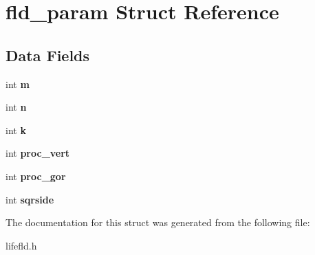 \hypertarget{structfld__param}{}\section{fld\+\_\+param Struct Reference}
\label{structfld__param}
\subsection*{Data Fields}
\begin{DoxyCompactItemize}
\item 
\hypertarget{structfld__param_a742204794ea328ba293fe59cec79b990}{}int {\bfseries m}\label{structfld__param_a742204794ea328ba293fe59cec79b990}

\item 
\hypertarget{structfld__param_a76f11d9a0a47b94f72c2d0e77fb32240}{}int {\bfseries n}\label{structfld__param_a76f11d9a0a47b94f72c2d0e77fb32240}

\item 
\hypertarget{structfld__param_ab66ed8e0098c0a86b458672a55a9cca9}{}int {\bfseries k}\label{structfld__param_ab66ed8e0098c0a86b458672a55a9cca9}

\item 
\hypertarget{structfld__param_a58e5c5695a2e64b7374969806d90191a}{}int {\bfseries proc\+\_\+vert}\label{structfld__param_a58e5c5695a2e64b7374969806d90191a}

\item 
\hypertarget{structfld__param_accbd2c2ef61b4a1eee1400037bd5a06a}{}int {\bfseries proc\+\_\+gor}\label{structfld__param_accbd2c2ef61b4a1eee1400037bd5a06a}

\item 
\hypertarget{structfld__param_a325bd3268e1877cda2a01cc850b02409}{}int {\bfseries sqrside}\label{structfld__param_a325bd3268e1877cda2a01cc850b02409}

\end{DoxyCompactItemize}


The documentation for this struct was generated from the following file\+:\begin{DoxyCompactItemize}
\item 
lifefld.\+h\end{DoxyCompactItemize}
